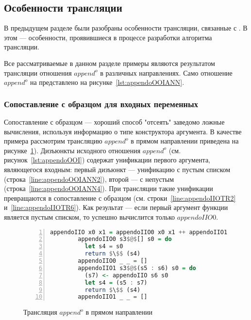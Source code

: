 \subsection{Особенности трансляции}

В предыдущем разделе были разобраны особенности трансляции, связанные с \miniKanren{}.
В этом --- особенности, проявившиеся в процессе разработки алгоритма трансляции.

Все рассматриваемые в данном разделе примеры являются результатом трансляции отношения $append^o$ в различных направлениях.
Само отношение $append^o$ на \miniKanren{} представлено на рисунке~\ref{lst:appendoOOIANN}.


\subsubsection{Сопоставление с образцом для входных переменных}

Сопоставление с образцом --- хороший способ "отсеять" заведомо ложные вычисления, используя информацию о типе конструктора аргумента.
В качестве примера рассмотрим трансляцию $append^o$ в прямом направлении приведена на рисунке~\ref{lst:appendoIIOTR}).
Дизъюнкты исходного отношения $append^o$ (см. рисунок~\ref{lst:appendoOOI}) содержат унификации первого аргумента, являющегося входным: первый дизъюнкт --- унификацию с пустым списком (строка~\ref{line:appendoOOIANN2}), второй --- с непустым (строка~\ref{line:appendoOOIANN4}).
При трансляции такие унификации превращаются в сопоставление с образцом (см. строки~\ref{line:appendoIIOTR2} и~\ref{line:appendoIIOTR6}).
Как результат --- если первый аргумент функции является пустым списком, то успешно вычислится только $appendoIIO0$.

\begin{figure}[h!]
  \begin{center}
  \begin{minipage}{0.7\textwidth}
  \begin{lstlisting}[language=Haskell, frame=single, numbers=left,numberstyle=\small, firstnumber=1, escapechar=|]
        appendoIIO x0 x1 = appendoIIO0 x0 x1 ++ appendoIIO1 x0 x1
        appendoIIO0 s3$@$[] s0 = do                                  |\label{line:appendoIIOTR2}|
          let s4 = s0
          return $\$$ (s4)
        appendoIIO0 _ _ = []                                         |\label{line:appendoIIOTR5}|
        appendoIIO1 s3$@$(s5 : s6) s0 = do                           |\label{line:appendoIIOTR6}|
          (s7) <- appendoIIO s6 s0
          let s4 = (s5 : s7)
          return $\$$ (s4)
        appendoIIO1 _ _ = []                                         |\label{line:appendoIIOTR10}|
    \end{lstlisting}
  \end{minipage}
  \end{center}
  \caption{Трансляция $append^o$ в прямом направлении}
  \label{lst:appendoIIOTR}
\end{figure}

